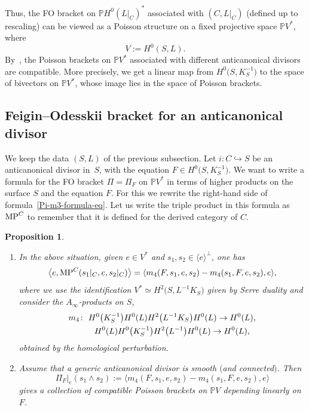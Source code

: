 \documentclass[10pt,a4paper]{amsart}
\numberwithin{equation}{section}
\newtheorem{Proposition}[Theorem]{Proposition}
 { \theoremstyle{definition}
\newtheorem{Definition}[Theorem]{Definition}
\newtheorem{Note}[Theorem]{Note}
\newtheorem{Example}[Theorem]{Example}
\newtheorem{Remark}[Theorem]{Remark}
\newtheorem{Remarks}[Theorem]{Remarks} }
\newcommand{\hra}{\hookrightarrow}
\newcommand{\we}{\wedge}
\renewcommand{\P}{{\mathbb P}}
\newcommand{\lan}{\langle}
\newcommand{\ran}{\rangle}
\begin{document}
Thus, the FO bracket on $\P H^0(L|_C)^*$ associated with $(C,L|_C)$ (defined up to rescaling) can be viewed as a Poisson structure on
a fixed projective space $\P V^*$, where
\[V:=H^0(S,L).\]
By~\cite[Theorem~4.4]{HP}, the Poisson brackets on $\P V^*$ associated with different anticanonical divisors are compatible.
More precisely, we get a linear map from $H^0\big(S,K_S^{-1}\big)$ to the space of bivectors on $\P V^*$, whose image lies in the space of Poisson brackets.

\subsection{Feigin--Odesskii bracket for an anticanonical divisor}

We keep the data $(S,L)$ of the previous subsection. Let $i\colon C\hra S$ be an anticanonical divisor in~$S$, with the equation $F\in H^0\big(S,K_S^{-1}\big)$.
We want to write a formula for the FO bracket $\Pi=\Pi_F$
on $\P V^*$ in terms of higher products on the surface $S$ and the equation $F$. For this we rewrite the right-hand side of formula~\eqref{Pi-m3-formula-eq}.
Let us write the triple product in this formula as~${\rm MP}^C$ to remember that it is defined for the derived category of $C$.

\begin{Proposition}\label{m4-prop}\quad
\begin{enumerate}\itemsep=0pt
\item[$(i)$] In the above situation,
given $e\in V^*$ and $s_1,s_2\in \lan e\ran^{\perp}$, one has
\[
\big\lan e,{\rm MP}^C(s_1|_C,e,s_2|_C)\big\ran=\lan m_4(F,s_1,e,s_2)-m_4(s_1,F,e,s_2),e\ran,\]
where we use the identification $V^*\simeq H^2\big(S,L^{-1}K_S\big)$ given by Serre duality and consider the $A_\infty$-products on $S$,
\begin{gather*}
m_4\colon \ H^0\big(K_S^{-1}\big)H^0(L)H^2\big(L^{-1}K_S\big)H^0(L)\to H^0(L), \\
\hphantom{m_4\colon}{} \ H^0(L)H^0\big(K_S^{-1}\big)H^2\big(L^{-1}\big)H^0(L)\to H^0(L),
\end{gather*}
obtained by the homological perturbation.

\item[$(ii)$] Assume that a generic anticanonical divisor is smooth $($and connected$)$. Then
\[\Pi_F|_e(s_1\we s_2):=\lan m_4(F,s_1,e,s_2)-m_4(s_1,F,e,s_2),e\ran\]
gives a collection of compatible Poisson brackets on $\P V$
depending linearly on $F$.
\end{enumerate}
\end{Proposition}
\end{document}
